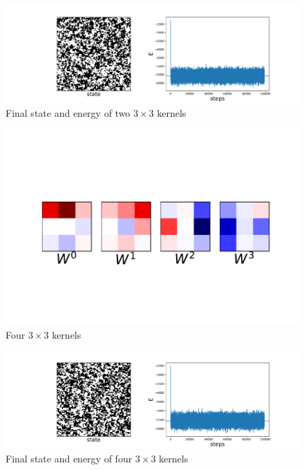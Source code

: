 \documentclass[12pt, two sided]{article}
\begin{document}
\begin{figure}[h!]
\includegraphics[width=\textwidth]{../figures/L_100_T_4.0_kernelDims_2-3_no_symmetries.pdf}
\caption{Final state and energy of two $3\times3$ kernels}
\end{figure}

\begin{figure}[h!]
\includegraphics[width=\textwidth]{../figures/T_4.0_kernelDims_4-3_no_symmetries.pdf}
\caption{Four $3\times3$ kernels}
\end{figure}

\begin{figure}[h!]
\includegraphics[width=\textwidth]{../figures/L_100_T_4.0_kernelDims_4-3_no_symmetries.pdf}
\caption{Final state and energy of four $3\times3$ kernels}
\end{figure}
\end{document}
